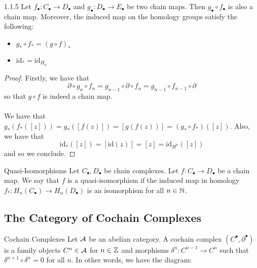 \documentclass[a4paper]{article}
\begin{document}
\begin{prp}{}{1.1.5} Let $f_\bullet:C_\bullet\to D_\bullet$ and $g_\bullet:D_\bullet\to E_\bullet$ be two chain maps. Then $g_\bullet\circ f_\bullet$ is also a chain map. Moreover, the induced map on the homology groups satisfy the following: 
\begin{itemize}
\item $g_\ast\circ f_\ast=(g\circ f)_\ast$
\item $\text{id}_\ast=\text{id}_{H_n}$
\end{itemize} \tcbline
\begin{proof}
Firstly, we have that $$\partial\circ g_n\circ f_n=g_{n-1}\circ\partial\circ f_n=g_{n-1}\circ f_{n-1}\circ\partial$$ so that $g\circ f$ is indeed a chain map. \\~\\

We have that $g_\ast(f_\ast([z]))=g_\ast([f(z)])=[g(f(z))]=(g_\ast\circ f_\ast)([z])$. Also, we have that $$\text{id}_\ast([z])=[\text{id}(z)]=[z]=\text{id}_{H^n}([z])$$ and so we conclude. 
\end{proof}
\end{prp}

\begin{defn}{Quasi-Isomorphisms}{} Let $C_\bullet,D_\bullet$ be chain complexes. Let $f:C_\bullet\to D_\bullet$ be a chain map. We say that $f$ is a quasi-isomorphism if the induced map in homology $f_\ast:H_n(C_\bullet)\to H_n(D_\bullet)$ is an isomorphism for all $n\in\mathbb{N}$. 
\end{defn}

\subsection{The Category of Cochain Complexes}
\begin{defn}{Cochain Complexes}{} Let $\mathcal{A}$ be an abelian category. A cochain complex $(C^\bullet,\partial^\bullet)$ is a family objects $C^n\in\mathcal{A}$ for $n\in\mathbb{Z}$ and morphisms $\delta^n:C^{n-1}\to C^n$ such that $\delta^{n+1}\circ\delta^n=0$ for all $n$. In other words, we have the diagram: \\~\\
\end{defn}
\end{document}
